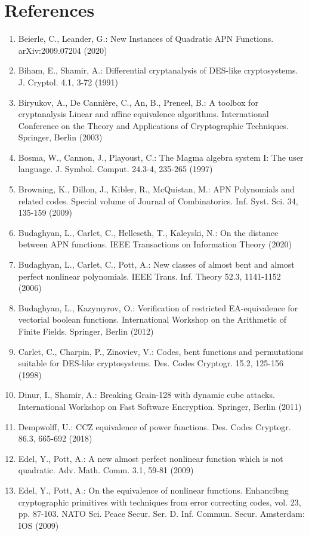 \documentclass[10pt]{article}
\begin{document}
\section*{References}
\begin{enumerate}
  \item Beierle, C., Leander, G.: New Instances of Quadratic APN Functions. arXiv:2009.07204 (2020)
  \item Biham, E., Shamir, A.: Differential cryptanalysis of DES-like cryptosystems. J. Cryptol. 4.1, 3-72 (1991)
  \item Biryukov, A., De Cannière, C., An, B., Preneel, B.: A toolbox for cryptanalysis Linear and affine equivalence algorithms. International Conference on the Theory and Applications of Cryptographic Techniques. Springer, Berlin (2003)
  \item Bosma, W., Cannon, J., Playoust, C.: The Magma algebra system I: The user language. J. Symbol. Comput. 24.3-4, 235-265 (1997)
  \item Browning, K., Dillon, J., Kibler, R., McQuistan, M.: APN Polynomials and related codes. Special volume of Journal of Combinatorics. Inf. Syst. Sci. 34, 135-159 (2009)
  \item Budaghyan, L., Carlet, C., Helleseth, T., Kaleyski, N.: On the distance between APN functions. IEEE Transactions on Information Theory (2020)
  \item Budaghyan, L., Carlet, C., Pott, A.: New classes of almost bent and almost perfect nonlinear polynomials. IEEE Trans. Inf. Theory 52.3, 1141-1152 (2006)
  \item Budaghyan, L., Kazymyrov, O.: Verification of restricted EA-equivalence for vectorial boolean functions. International Workshop on the Arithmetic of Finite Fields. Springer, Berlin (2012)
  \item Carlet, C., Charpin, P., Zinoviev, V.: Codes, bent functions and permutations suitable for DES-like cryptosystems. Des. Codes Cryptogr. 15.2, 125-156 (1998)
  \item Dinur, I., Shamir, A.: Breaking Grain-128 with dynamic cube attacks. International Workshop on Fast Software Encryption. Springer, Berlin (2011)
  \item Dempwolff, U.: CCZ equivalence of power functions. Des. Codes Cryptogr. 86.3, 665-692 (2018)
  \item Edel, Y., Pott, A.: A new almost perfect nonlinear function which is not quadratic. Adv. Math. Comm. 3.1, 59-81 (2009)
  \item Edel, Y., Pott, A.: On the equivalence of nonlinear functions. Enhancibng cryptographic primitives with techniques from error correcting codes, vol. 23, pp. 87-103. NATO Sci. Peace Secur. Ser. D. Inf. Commun. Secur. Amsterdam: IOS (2009)

\end{enumerate}
\end{document}
